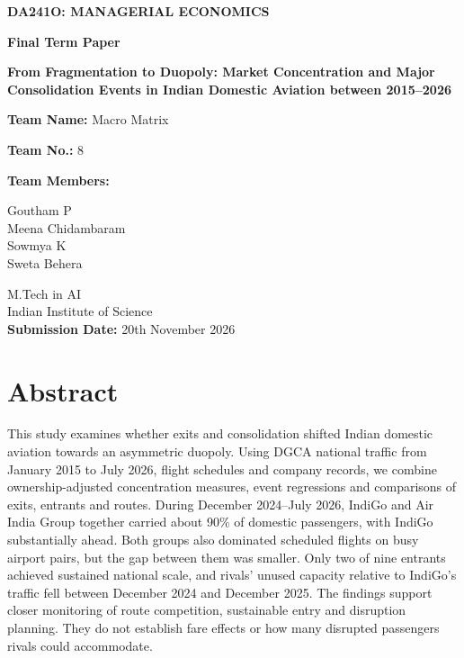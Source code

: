 \documentclass[12pt,a4paper]{article}
\begin{document}
\hypersetup{pageanchor=false}
\begin{titlepage}
\centering
\vspace*{1cm}
{\Large\bfseries DA241O: MANAGERIAL ECONOMICS\par}
\vspace{0.8cm}
{\LARGE\bfseries Final Term Paper\par}
\vspace{1cm}
{\Large\bfseries From Fragmentation to Duopoly: Market Concentration and Major Consolidation Events in Indian Domestic Aviation between 2015--2026\par}
\vspace{1cm}
{\large\textbf{Team Name:} Macro Matrix\par}
{\large\textbf{Team No.:} 8\par}
\vspace{0.75cm}
{\large\textbf{Team Members:}\par}
\vspace{0.3cm}
{\large \textcolor{authorGoutham}{Goutham P}\\
\textcolor{authorMeena}{Meena Chidambaram}\\
\textcolor{authorSowmya}{Sowmya K}\\
\textcolor{authorSweta}{Sweta Behera}\par}
\vfill
{\large M.Tech in AI\\
Indian Institute of Science\\[0.5cm]
\textbf{Submission Date:} 20th November 2026\par}
\end{titlepage}
\hypersetup{pageanchor=true}
\setcounter{page}{1}

\section*{Abstract}
This study examines whether exits and consolidation shifted Indian domestic aviation towards an asymmetric duopoly. Using DGCA national traffic from January 2015 to July 2026, flight schedules and company records, we combine ownership-adjusted concentration measures, event regressions and comparisons of exits, entrants and routes. During December 2024--July 2026, IndiGo and Air India Group together carried about 90\% of domestic passengers, with IndiGo substantially ahead. Both groups also dominated scheduled flights on busy airport pairs, but the gap between them was smaller. Only two of nine entrants achieved sustained national scale, and rivals' unused capacity relative to IndiGo's traffic fell between December 2024 and December 2025. The findings support closer monitoring of route competition, sustainable entry and disruption planning. They do not establish fare effects or how many disrupted passengers rivals could accommodate.
\end{document}
